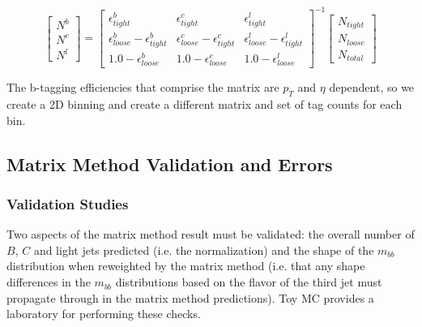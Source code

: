         \begin{equation}
            \begin{bmatrix} \scriptstyle
                N^b \\ \scriptstyle
                N^c \\ \scriptstyle
                N^l
            \end{bmatrix} 
            = 
            \begin{bmatrix} \scriptstyle
                \epsilon^b_{tight} & \scriptstyle \epsilon^c_{tight} & \scriptstyle \epsilon^l_{tight} \\  \scriptstyle
                \epsilon^b_{loose} - \epsilon^b_{tight} & \scriptstyle \epsilon^c_{loose} - \epsilon^c_{tight} & \scriptstyle \epsilon^l_{loose} - \epsilon^l_{tight} \\      \scriptstyle
                1.0 - \epsilon^b_{loose} & \scriptstyle 1.0 - \epsilon^c_{loose} & \scriptstyle  1.0 - \epsilon^l_{loose}
            \end{bmatrix}
            ^{-1}
            \begin{bmatrix} \scriptstyle
            N_{tight} \\ \scriptstyle
            N_{loose} \\ \scriptstyle
            N_{total}
            \end{bmatrix}  
        \label{eq:matrix2} 
        \end{equation} %

The b-tagging efficiencies that comprise the matrix are $p_T$ and $\eta$ dependent, so we create a 2D binning and create a different matrix and set of tag counts for each bin.  



\subsection{Matrix Method Validation and Errors}
\subsubsection{Validation Studies}
Two aspects of the matrix method result must be validated: the overall number of $B$, $C$ and light jets predicted (i.e. the normalization) and the shape of the $m_{bb}$ distribution when reweighted by the matrix method (i.e. that any shape differences in the $m_{bb}$ distributions based on the flavor of the third jet must propagate through in the matrix method predictions).  Toy MC provides a laboratory for performing these checks.  

